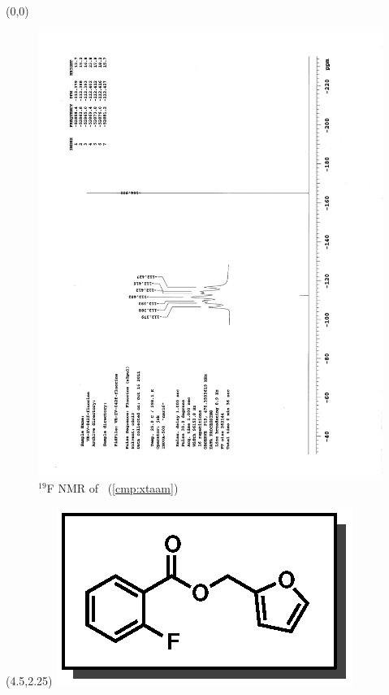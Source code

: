 \clearpage
\begin{textblock}{20}(0,0)
\begin{figure}[htb]
\caption{$^{19}$F NMR of  \CMPxtaam\ (\ref{cmp:xtaam})}
\includegraphics[scale=0.75, trim = 0mm 0mm 0mm 5mm,
clip]{chp_asymmetric/images/nmr/xtaamF}
\vspace{-100pt}
\end{figure}
\end{textblock}
\begin{textblock}{1}(4.5,2.25)
\includegraphics[scale=0.8, angle=90]{chp_asymmetric/images/xtaam}
\end{textblock}
\clearpage

